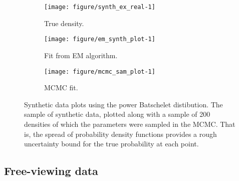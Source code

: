\begin{figure}
\begin{center}
  \begin{subfigure}[t]{0.32\linewidth}
\begin{knitrout}
\color{fgcolor}
\texttt{[image: figure/synth\_ex\_real-1]} 

\end{knitrout}
    \caption{True density.}
    \label{fig:fit:true}
  \end{subfigure}%
  \begin{subfigure}[t]{0.32\linewidth}
\begin{knitrout}
\color{fgcolor}
\texttt{[image: figure/em\_synth\_plot-1]} 

\end{knitrout}
    \caption{Fit from EM algorithm.}
    \label{fig:fit:em}
  \end{subfigure}
  \begin{subfigure}[t]{0.32\linewidth}
\begin{knitrout}
\color{fgcolor}
\texttt{[image: figure/mcmc\_sam\_plot-1]} 

\end{knitrout}
    \caption{MCMC fit.}
    \label{fig:mcmc_dens_synth}
  \end{subfigure}
\end{center}
\caption{Synthetic data plots using the power Batschelet distibution. The sample of synthetic data, plotted along with a sample of 200 densities of which the parameters were sampled in the MCMC. That is, the spread of probability density functions provides a rough uncertainty bound for the true probability at each point.}
\label{fig:fit}
\end{figure}


























\subsection{Free-viewing data}
\label{sub:fv}

